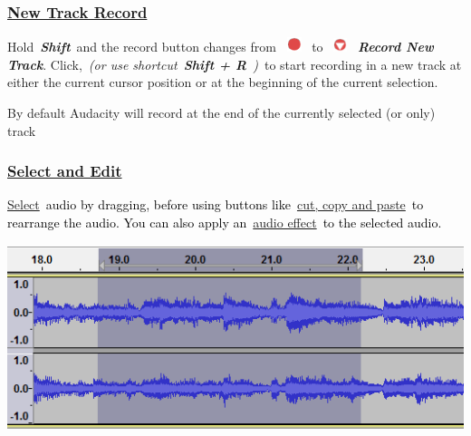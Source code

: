 \documentclass[letterpaper]{article}
\begin{document}
\subsubsection[New Track
Record]{\href{https://manual.audacityteam.org/man/recording.html\#newtrack}{\textcolor[rgb]{0.3529412,0.21176471,0.5882353}{New
Track Record}}}
{\color{black}
Hold~\textbf{\textit{Shift}}~and the record button changes from~
\includegraphics[width=0.423cm,height=0.423cm]{TourGuide-img002.png} ~to~
\includegraphics[width=0.397cm,height=0.397cm]{TourGuide-img005.png} ~\textbf{\textit{Record New Track}}.
Click,~\textit{(or use shortcut~}\textbf{\textit{Shift + R}}\textit{~)}~to start recording in a new track at either the
current cursor position or at the beginning of the current selection.}

{\color{black}
By default Audacity will record at the end of the currently selected (or only) track}

\subsubsection[Select and
Edit]{\href{https://manual.audacityteam.org/man/selecting_audio_the_basics.html}{\textcolor[rgb]{0.3529412,0.21176471,0.5882353}{Select
and Edit}}}
\href{https://manual.audacityteam.org/man/selecting_audio_the_basics.html}{\textcolor[rgb]{0.3529412,0.21176471,0.5882353}{Select}}\textcolor{black}{~audio
by dragging, before using buttons
like~}\href{https://manual.audacityteam.org/man/edit_toolbar.html}{\textcolor[rgb]{0.3529412,0.21176471,0.5882353}{cut,
copy and paste}}\textcolor{black}{~to rearrange the audio. You can also apply
an~}\href{https://manual.audacityteam.org/man/effect_menu_audacity.html}{\textcolor[rgb]{0.3529412,0.21176471,0.5882353}{audio
effect}}\textcolor{black}{~to the selected audio.}

 \includegraphics[width=13.626cm,height=5.45cm]{TourGuide-img007.png} 
\end{document}
